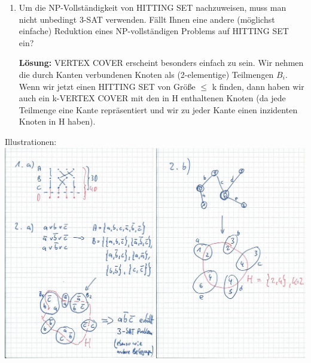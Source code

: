 \documentclass[12pt,a4paper]{scrartcl}
\newcommand{\loesung}[1]{\vspace{.5\baselineskip}\begin{addmargin}[0pt]{0pt}\textbf{Lösung: }#1\end{addmargin}}
\begin{document}
\begin{enumerate}
\begin{enumerate}
{	}
	
	\item Um die NP-Vollständigkeit von HITTING SET nachzuweisen, muss man nicht unbedingt 3-SAT verwenden. Fällt Ihnen eine andere (möglichst einfache) Reduktion eines NP-vollständigen Problems auf HITTING SET ein?
	
	\loesung{VERTEX COVER erscheint besonders einfach zu sein. Wir nehmen die durch Kanten verbundenen Knoten als (2-elementige) Teilmengen $B_i$. Wenn wir jetzt einen HITTING SET von Größe $\leq$ k finden, dann haben wir auch ein k-VERTEX COVER mit den in H enthaltenen Knoten (da jede Teilmenge eine Kante repräsentiert und wir zu jeder Kante einen inzidenten Knoten in H haben).}
	\end{enumerate}

\end{enumerate}

Illustrationen: \\


\includegraphics [scale=0.6] {Ueb01_1.jpg}
\end{document}
